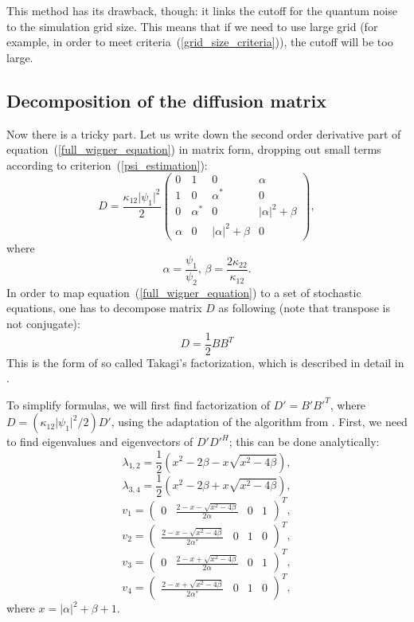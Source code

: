 \documentclass[12pt,notitlepage]{report}
\begin{document}
This method has its drawback, though: it links the cutoff for the quantum noise to the simulation grid size.
This means that if we need to use large grid (for example, in order to meet criteria~(\ref{grid_size_criteria})),
the cutoff will be too large.

\subsection*{Decomposition of the diffusion matrix}

Now there is a tricky part. Let us write down the second order derivative part of equation~(\ref{full_wigner_equation})
in matrix form, dropping out small terms according to criterion~(\ref{psi_estimation}):
\[
D = \frac{\kappa_{12} \lvert \psi_1 \rvert^2}{2}  \begin{pmatrix}
0 & 1 & 0 & \alpha \\
1 & 0 & \alpha^* & 0 \\
0 & \alpha^* & 0 & \lvert \alpha \rvert^2 + \beta \\
\alpha & 0 & \lvert \alpha \rvert^2 + \beta & 0 \end{pmatrix},
\]
where
\[
\alpha = \frac{\psi_1}{\psi_2},\, \beta = \frac{2 \kappa_{22}}{\kappa_{12}}.
\]
In order to map equation~(\ref{full_wigner_equation}) to a set of stochastic equations, 
one has to decompose matrix $D$ as following (note that transpose is not conjugate):
\[ D = \frac{1}{2} B B^T \]
This is the form of so called Takagi's factorization, which is described in detail in \cite{horn_matrix_analysis}.

To simplify formulas, we will first find factorization of $D' = B' B'^T$, where $D = \left( \kappa_{12} \lvert \psi_1 \rvert^2 / 2 \right) D'$,
using the adaptation of the algorithm from \cite{horn_matrix_analysis}.
First, we need to find eigenvalues and eigenvectors of $D'D'^H$; this can be done analytically:
\[ \lambda_{1,2} = \frac{1}{2} \left( x^2 - 2 \beta - x \sqrt{x^2 - 4 \beta} \right), \]
\[ \lambda_{3,4} = \frac{1}{2} \left( x^2 - 2 \beta + x \sqrt{x^2 - 4 \beta} \right), \]
\[ v_1 = \begin{pmatrix} 0 & \frac{2 - x - \sqrt{x^2 - 4 \beta}}{2 \alpha} & 0 & 1 \end{pmatrix}^T, \]
\[ v_2 = \begin{pmatrix} \frac{2 - x - \sqrt{x^2 - 4 \beta}}{2 \alpha^*} & 0 & 1 & 0 \end{pmatrix}^T, \]
\[ v_3 = \begin{pmatrix} 0 & \frac{2 - x + \sqrt{x^2 - 4 \beta}}{2 \alpha} & 0 & 1 \end{pmatrix}^T, \]
\[ v_4 = \begin{pmatrix} \frac{2 - x + \sqrt{x^2 - 4 \beta}}{2 \alpha^*} & 0 & 1 & 0 \end{pmatrix}^T, \]
where $x = \lvert \alpha \rvert^2 + \beta + 1$.
\end{document}

